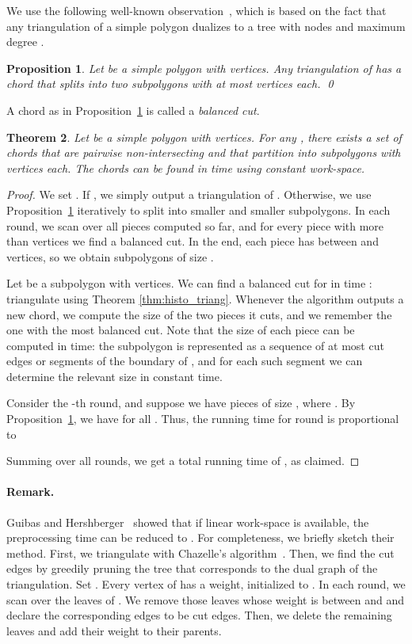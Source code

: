 \documentclass[11pt,a4paper]{article}
\newtheorem{theorem}{Theorem}[section]
\newtheorem{proposition}[theorem]{Proposition}
\begin{document}
We use the following well-known observation~\cite{Chazelle82},
which is based on the fact that
any triangulation of a simple polygon dualizes to a tree with
 nodes and
maximum degree .
 \begin{proposition}
\label{prop:cut}
   Let  be a simple polygon with  vertices.
   Any triangulation of  has a chord that splits  into
   two subpolygons with at most
    vertices each.
\qed
 \end{proposition}

A chord as in Proposition~\ref{prop:cut} is called a \emph{balanced cut}.

\begin{theorem}\label{thm:preprocess}
Let  be a simple polygon with  vertices. For any ,
there exists a set of  chords that are pairwise non-intersecting and that
partition  into  subpolygons with  vertices each.
The chords can be found in  time using constant work-space.
\end{theorem}
\begin{proof}
We set .
If , we simply output a triangulation of .
Otherwise, we use Proposition~\ref{prop:cut} iteratively to
split  into smaller and smaller subpolygons.
In each round, we scan over all pieces computed so far,
and for every piece with more than  vertices we find a balanced
cut.
In the end, each piece has between  and  vertices, so
we obtain  subpolygons of size .

Let  be a subpolygon with  vertices. We can find a balanced cut for 
in time : triangulate  using Theorem \ref{thm:histo_triang}.
Whenever the algorithm outputs a new chord, we compute the size
of the two pieces it cuts, and we remember the one with
the most balanced cut. Note that the size of each piece can
be computed in  time: the  subpolygon  is represented as
a sequence of at most  cut edges or segments of the boundary of ,
and for each such segment we can determine the relevant size in
constant time.

Consider the -th round, and  suppose we have  pieces of size
, where .
By Proposition~\ref{prop:cut},
we have  for all .
Thus,  the running time for round  is proportional to

Summing over all rounds, we get a total running time of , as claimed.
\end{proof}

\paragraph{Remark.}
Guibas and Hershberger~\cite{GuiHers89} showed that
if linear work-space is available, the preprocessing time can be reduced
to . For completeness, we briefly sketch their method.
First, we triangulate  with Chazelle's
algorithm~\cite{Chazelle91}.
Then, we find the cut edges by greedily pruning the tree  that
corresponds to the dual graph of the triangulation.
Set .
Every vertex of  has a weight, initialized to .
In each round, we scan over the leaves of . We remove those
leaves whose weight is between  and 
and declare the corresponding edges to be cut edges. Then, we
delete the remaining leaves and add their weight to their parents.
\end{document}

